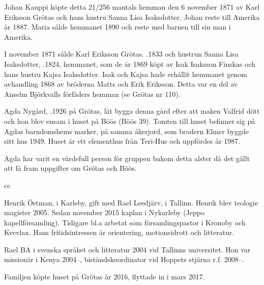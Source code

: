 Johan Kauppi köpte detta 21/256 mantals hemman den 6 november 1871 av Karl Eriksson Grötas och hans hustru Sanna Lisa Isaksdotter. Johan reste till Amerika år 1887. Maria sålde hemmanet 1890 och reste med barnen till sin man i Amerika.


%
I november 1871 sålde Karl Eriksson Grötas. .1833 och hustrun Sanna Lisa Isaksdotter, .1824, hemmanet, som de år 1869 köpt av Isak Isaksson Finskas och hans hustru Kajsa Isaksdotter. Isak och Kajsa hade erhållit hemmanet genom avhandling 1868 av bröderna Matts och Erik Eriksson. Detta var en del av Anselm Björkvalls förfäders hemman (se Grötas nr 110).



%



%
Agda Nygård, .1926 på Grötas, lät bygga denna gård efter att maken Valfrid dött och hon blev ensam i huset på Böös (Böös 39). Tomten till huset befinner sig på Agdas barndomshems marker, på samma åkerjord, som brodern Elmer byggde sitt hus 1949. Huset är ett elementhus från Teri-Hus och uppfördes år 1987.

Agda har varit en värdefull person för gruppen bakom detta alster då det gällt att få fram uppgifter om Grötas och Böös.

cc %


%



%
Henrik Östman,  i Karleby, gift med Rael Leedjärv,   i Tallinn. Henrik blev teologie magister 2005. Sedan november 2015 kaplan i Nykarleby (Jeppo kapellförsamling). Tidigare bl.a arbetat som församlingspastor i Kronoby och Kvevlax. Hans fritidsintressen är orientering, motionsidrott och litteratur.

Rael BA i svenska språket och litteratur 2004 vid Tallinns universitet. Hon var missionär i Kenya 2004--, biståndskoordinator vid Hoppets stjärna r.f. 2008--.
\begin{jhchildren}
  \item {}
  \item {}
\end{jhchildren}
Familjen köpte huset på Grötas år 2016, flyttade in i mars 2017.


